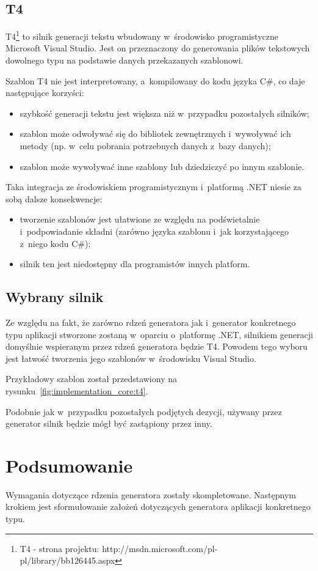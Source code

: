 \subsection{T4}

T4\footnote{T4 - strona projektu: http://msdn.microsoft.com/pl-pl/library/bb126445.aspx} to silnik generacji tekstu wbudowany w~środowisko programistyczne Microsoft Visual Studio.
Jest on przeznaczony do generowania plików tekstowych dowolnego typu na podstawie danych przekazanych szablonowi.

Szablon T4 nie jest interpretowany, a~kompilowany do kodu języka C\#, co daje następujące korzyści:

\begin{itemize}
 \item szybkość generacji tekstu jest większa niż w~przypadku pozostałych silników;
 \item szablon może odwoływać się do bibliotek zewnętrznych i~wywoływać ich metody (np. w~celu pobrania potrzebnych danych z~bazy danych);
 \item szablon może wywoływać inne szablony lub dziedziczyć po innym szablonie.
\end{itemize}

Taka integracja ze środowiskiem programistycznym i~platformą .NET niesie za sobą dalsze konsekwencje:

\begin{itemize}
 \item tworzenie szablonów jest ułatwione ze względu na podświetalnie i~podpowiadanie składni (zarówno języka szablonu i~jak korzystającego z~niego kodu C\#);
 \item silnik ten jest niedostępny dla programistów innych platform.
\end{itemize}


\subsection{Wybrany silnik}

Ze względu na fakt, że zarówno rdzeń generatora jak i~generator konkretnego typu aplikacji stworzone zostaną w~oparciu o~platformę .NET, silnikiem generacji domyślnie wspieranym przez rdzeń generatora będzie T4.
Powodem tego wyboru jest łatwość tworzenia jego szablonów w~środowisku Visual Studio.

Przykładowy szablon został przedstawiony na rysunku~\ref{fig:implementation_core:t4}.



Podobnie jak w~przypadku pozostałych podjętych dezycji, używany przez generator silnik będzie mógł być zastąpiony przez inny.



\section{Podsumowanie}

Wymagania dotyczące rdzenia generatora zostały skompletowane.
Następnym krokiem jest sformułowanie założeń dotyczących generatora aplikacji konkretnego typu.
